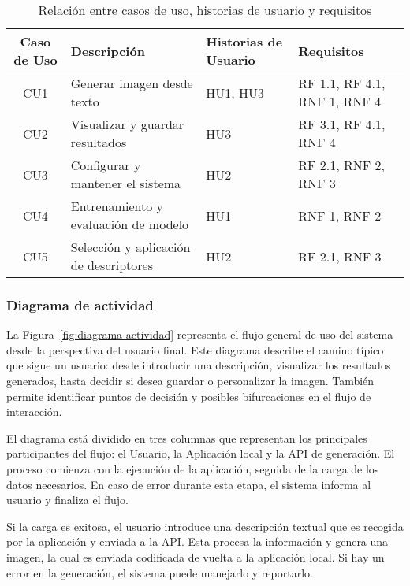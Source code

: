 \begin{table}[H]
    \centering
    \renewcommand{\arraystretch}{1.4}
    \begin{tabular}{|c|p{4.5cm}|p{2.5cm}|p{4cm}|}
        \hline
        \rowcolor{gray!30}
        \textbf{Caso de Uso} & \textbf{Descripción} & \textbf{Historias de Usuario} & \textbf{Requisitos} \\
        \hline
        CU1 & Generar imagen desde texto & HU1, HU3 & RF 1.1, RF 4.1, RNF 1, RNF 4 \\
        \hline
        CU2 & Visualizar y guardar resultados & HU3 & RF 3.1, RF 4.1, RNF 4 \\
        \hline
        CU3 & Configurar y mantener el sistema & HU2 & RF 2.1, RNF 2, RNF 3 \\
        \hline
        CU4 & Entrenamiento y evaluación de modelo & HU1 & RNF 1, RNF 2 \\
        \hline
        CU5 & Selección y aplicación de descriptores & HU2 & RF 2.1, RNF 3 \\
        \hline
    \end{tabular}
    \caption{Relación entre casos de uso, historias de usuario y requisitos}
    \label{tab:trazabilidad-casos-hu-req}
\end{table}

\subsubsection{Diagrama de actividad}
La Figura~\ref{fig:diagrama-actividad} representa el flujo general de uso del sistema desde la perspectiva del usuario final. Este diagrama describe el camino típico que sigue un usuario: desde introducir una descripción, visualizar los resultados generados, hasta decidir si desea guardar o personalizar la imagen. También permite identificar puntos de decisión y posibles bifurcaciones en el flujo de interacción.

El diagrama está dividido en tres columnas que representan los principales participantes del flujo: el Usuario, la Aplicación local y la API de generación. El proceso comienza con la ejecución de la aplicación, seguida de la carga de los datos necesarios. En caso de error durante esta etapa, el sistema informa al usuario y finaliza el flujo.

Si la carga es exitosa, el usuario introduce una descripción textual que es recogida por la aplicación y enviada a la API. Esta procesa la información y genera una imagen, la cual es enviada codificada de vuelta a la aplicación local. Si hay un error en la generación, el sistema puede manejarlo y reportarlo.

